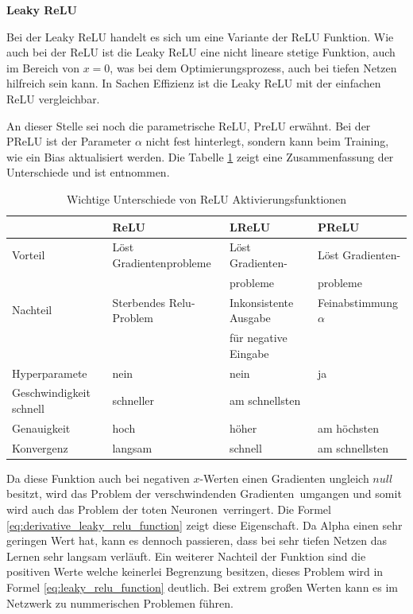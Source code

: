 %
\textbf{Leaky ReLU}\vspace{0.2cm}

Bei der Leaky ReLU handelt es sich um eine Variante der ReLU Funktion. Wie auch bei der ReLU ist die Leaky ReLU eine nicht lineare stetige Funktion, auch im Bereich von $x = 0$, was bei dem Optimierungsprozess, auch bei tiefen Netzen hilfreich sein kann. In Sachen Effizienz ist die Leaky ReLU mit der einfachen ReLU vergleichbar.\vspace{0.2cm}

An dieser Stelle sei noch die parametrische ReLU, PreLU erwähnt. Bei der PReLU ist der Parameter $\alpha$ nicht fest hinterlegt, sondern kann beim Training, wie ein Bias aktualisiert werden. Die Tabelle \ref{tab:relu_types_differents} zeigt eine Zusammenfassung der Unterschiede und ist \cite{bhargav-2023} entnommen.

\begin{center}
	\begin{table}[!ht]
		\begin{tabular}{>{\small}l>{\small}l>{\small}l>{\small}l}
			& \textbf{ReLU} & \textbf{LReLU} & \textbf{PReLU} \\
			\hline
			Vorteil & Löst Gradientenprobleme & Löst Gradienten- & Löst Gradienten- \\
			&& probleme & probleme \\
			Nachteil & Sterbendes Relu-Problem & Inkonsistente Ausgabe & Feinabstimmung $\alpha$ \\
			&& für negative Eingabe & \\
			Hyperparamete & nein & nein & ja \\
			Geschwindigkeit schnell& schneller & am schnellsten & \\
			Genauigkeit & hoch& höher & am höchsten \\
			Konvergenz & langsam & schnell & am schnellsten \\
		\end{tabular}
		\caption{Wichtige Unterschiede von ReLU Aktivierungsfunktionen}
		\label{tab:relu_types_differents}
	\end{table}
\end{center}

Da diese Funktion auch bei negativen $x$-Werten einen Gradienten ungleich $null$ besitzt, wird das \glqq Problem der verschwindenden Gradienten\grqq \ umgangen und somit wird auch das Problem der \glqq toten Neuronen\grqq \ verringert. Die Formel \ref{eq:derivative_leaky_relu_function} zeigt diese Eigenschaft. Da Alpha einen sehr geringen Wert hat, kann es dennoch passieren, dass bei sehr tiefen Netzen das Lernen sehr langsam verläuft. Ein weiterer Nachteil der Funktion sind die positiven Werte welche keinerlei Begrenzung besitzen, dieses Problem wird in Formel \ref{eq:leaky_relu_function} deutlich. Bei extrem großen Werten kann es im Netzwerk zu nummerischen Problemen führen.

